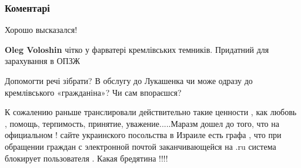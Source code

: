  
 
 
 
 
\subsubsection{Коментарі}

\begin{itemize}

Хорошо высказался!

\begin{itemize}
 

\textbf{Oleg Voloshin} чітко у фарватері кремлівських темників.
Придатний для зарахування в ОПЗЖ
\end{itemize}

 

Допомогти речі зібрати?
В обслугу до Лукашенка чи може одразу до кремлівського «гражданіна»?
Чи сам впораєшся?

 

К сожалению раньше транслировали действительно такие ценности , как любовь ,
помощь, терпимость, принятие, уважение.....Маразм дошел до того, что на
официальном ! сайте украинского посольства в Израиле есть графа , что при
обращении граждан с электронной почтой заканчивающейся на .ru система блокирует
пользователя . Какая бредятина !!!!


\end{itemize}
